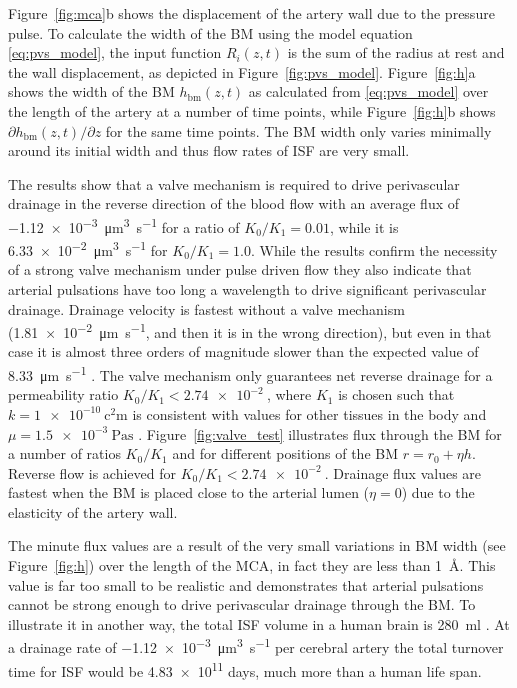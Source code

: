 \documentclass{frontiersFPHY} %
\begin{document}
Figure~\ref{fig:mca}b shows the displacement of the artery wall due to the pressure pulse. To calculate the width of the BM using the model equation \eqref{eq:pvs_model}, the input function $R_i(z,t)$ is the sum of the radius at rest and the wall displacement, as depicted in Figure~\ref{fig:pvs_model}. Figure~\ref{fig:h}a shows the width of the BM $h_\textrm{bm}(z,t)$ as calculated from \eqref{eq:pvs_model} over the length of the artery at a number of time points, while Figure~\ref{fig:h}b shows $\partial h_\textrm{bm}(z,t)/ \partial z$ for the same time points. The BM width only varies minimally around its initial width and thus flow rates of ISF are very small.

The results show that a valve mechanism is required to drive perivascular drainage in the reverse direction of the blood flow with an average flux of \SI{-1.12e-3}{\cubic\micro\metre\per\second} for a ratio of $K_0/K_1 = 0.01$, while it is \SI{6.33e-2}{\cubic\micro\metre\per\second} for $K_0/K_1 = 1.0$. While the results confirm the necessity of a strong valve mechanism under pulse driven flow they also indicate that arterial pulsations have too long a wavelength to drive significant perivascular drainage. Drainage velocity is fastest without a valve mechanism (\SI{1.81e-2}{\micro\metre\per\second}, and then it is in the wrong direction), but even in that case it is almost three orders of magnitude slower than the expected value of \SI{8.33}{\micro\metre\per\second} \cite{Carare2008}. The valve mechanism only guarantees net reverse drainage for a permeability ratio $K_0/K_1 < \SI{2.74e-2}{}$, where $K_1$ is chosen such that $k = \SI{1e-10}{\square\centi\metre}$ is consistent with values for other tissues in the body and $\mu = \SI{1.5e-3}{\pascal\second}$ \cite{Heppell2013}. Figure~\ref{fig:valve_test} illustrates flux through the BM for a number of ratios $K_0/K_1$ and for different positions of the BM $r = r_0 + \eta h$. Reverse flow is achieved for $K_0/K_1 < \SI{2.74e-2}{}$. Drainage flux values are fastest when the BM is placed close to the arterial lumen ($\eta = 0$) due to the elasticity of the artery wall.

The minute flux values are a result of the very small variations in BM width (see Figure~\ref{fig:h}) over the length of the MCA, in fact they are less than \SI{1}{\angstrom}. This value is far too small to be realistic and demonstrates that arterial pulsations cannot be strong enough to drive perivascular drainage through the BM. To illustrate it in another way, the total ISF volume in a human brain is \SI{280}{\milli\litre} \cite{Weller2015a}. At a drainage rate of \SI{-1.12e-3}{\cubic\micro\metre\per\second} per cerebral artery the total turnover time for ISF would be \SI{4.83e11}{} days, much more than a human life span.
\end{document}
